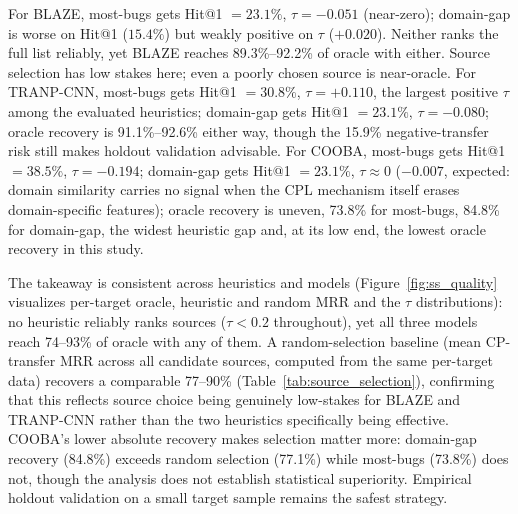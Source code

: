 \documentclass[a4paper,fleqn]{cas-dc}
\begin{document}
 For BLAZE, most-bugs gets Hit@1 $= 23.1\%$, $\tau = -0.051$
(near-zero); domain-gap is worse on Hit@1 ($15.4\%$) but weakly positive on
$\tau$ ($+0.020$). Neither ranks the full list reliably, yet BLAZE reaches
89.3\%--92.2\% of oracle with either. Source selection has low stakes
here; even a poorly chosen source is near-oracle. For TRANP-CNN, most-bugs
gets Hit@1 $=30.8\%$, $\tau = +0.110$, the largest positive $\tau$ among the
evaluated heuristics; domain-gap gets Hit@1 $=23.1\%$,
$\tau = -0.080$; oracle recovery is 91.1\%--92.6\% either way, though the
15.9\% negative-transfer risk still makes holdout validation
advisable. For COOBA, most-bugs gets Hit@1 $=38.5\%$, $\tau = -0.194$;
domain-gap gets Hit@1 $=23.1\%$, $\tau \approx 0$ ($-0.007$, expected: domain
similarity carries no signal when the CPL mechanism itself erases
domain-specific features); oracle recovery is uneven, 73.8\% for
most-bugs, 84.8\% for domain-gap, the widest heuristic gap and, at its
low end, the lowest oracle recovery in this study.

The takeaway is consistent across heuristics and models
(Figure~\ref{fig:ss_quality} visualizes per-target oracle, heuristic and random MRR and the $\tau$ distributions): no
heuristic reliably ranks sources ($\tau < 0.2$ throughout), yet all three
models reach 74--93\% of oracle with any of them. A random-selection
baseline (mean CP-transfer MRR across all candidate sources, computed from
the same per-target data) recovers a comparable 77--90\% (Table~\ref{tab:source_selection}),
confirming that this reflects source choice being genuinely low-stakes for
BLAZE and TRANP-CNN rather than the two heuristics specifically being
effective. COOBA's lower absolute
recovery makes selection matter more: domain-gap recovery (84.8\%) exceeds
random selection (77.1\%) while most-bugs (73.8\%) does not, though the
analysis does not establish statistical superiority. Empirical holdout validation on a small target sample
remains the safest strategy.
\end{document}
